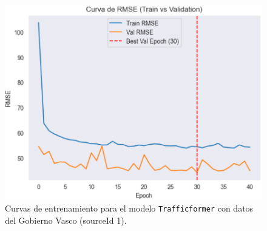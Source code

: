\begin{figure}[H]
\begin{minipage}{0.48\textwidth}
		\vspace{0.2cm}
		\includegraphics[width=\linewidth]{includes/cap5/graphs/sid1_trafficformer_rmse.png}
	\end{minipage}
	\caption{Curvas de entrenamiento para el modelo \texttt{Trafficformer} con datos del Gobierno Vasco (sourceId 1).}
	\label{fig:curvas_sid1_trafficformer}
\end{figure}


